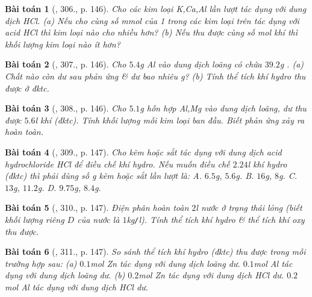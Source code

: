 \documentclass{article}
\newtheorem{baitoan}{Bài toán}
\begin{document}
\begin{baitoan}[\cite{An_400_BT_Hoa_Hoc_8_2020}, 306., p. 146]
	Cho các kim loại \emph{K,Ca,Al} lần lượt tác dụng với dung dịch \emph{HCl}. (a) Nếu cho cùng số mmol của 1 trong các kim loại trên tác dụng với acid \emph{HCl} thì kim loại nào cho nhiều \emph{} hơn? (b) Nếu thu được cùng số mol khí \emph{} thì khối lượng kim loại nào ít hơn?
\end{baitoan}

\begin{baitoan}[\cite{An_400_BT_Hoa_Hoc_8_2020}, 307., p. 146]
	Cho $5.4$\emph{g Al} vào dung dịch \emph{} loãng có chứa $39.2$\emph{g }. (a) Chất nào còn dư sau phản ứng \& dư bao nhiêu \emph{g}? (b) Tính thể tích khí hydro thu được ở đktc.
\end{baitoan}

\begin{baitoan}[\cite{An_400_BT_Hoa_Hoc_8_2020}, 308., p. 146]
	Cho $5.1$\emph{g} hỗn hợp \emph{Al,Mg} vào dung dịch \emph{} loãng, dư thu được $5.6$\emph{l} khí \emph{} (đktc). Tính khối lượng mỗi kim loại ban đầu. Biết phản ứng xảy ra hoàn toàn.
\end{baitoan}

\begin{baitoan}[\cite{An_400_BT_Hoa_Hoc_8_2020}, 309., p. 147]
	Cho kẽm hoặc sắt tác dụng với dung dịch acid hydrochloride \emph{HCl} để điều chế khí hydro. Nếu muốn điều chế $2.24$\emph{l} khí hydro (đktc) thì phải dùng số \emph{g} kẽm hoặc sắt lần lượt là: {\sf A.} $6.5$\emph{g}, $5.6$\emph{g}. {\sf B.} $16$\emph{g}, $8$\emph{g}. {\sf C.} $13$\emph{g}, $11.2$\emph{g}. {\sf D.} $9.75$\emph{g}, $8.4$\emph{g}.
\end{baitoan}

\begin{baitoan}[\cite{An_400_BT_Hoa_Hoc_8_2020}, 310., p. 147]
	Điện phân hoàn toàn $2$\emph{l} nước ở trạng thái lỏng (biết khối lượng riêng $D$ của nước là $1$\emph{kg\texttt{/}l}). Tính thể tích khí hydro \& thể tích khí oxy thu được.
\end{baitoan}

\begin{baitoan}[\cite{An_400_BT_Hoa_Hoc_8_2020}, 311., p. 147]
	So sánh thể tích khí hydro (đktc) thu được trong mỗi trường hợp sau: (a) $0.1$\emph{mol Zn} tác dụng với dung dịch \emph{} loãng dư. $0.1$\emph{mol Al} tác dụng với dung dịch \emph{} loãng dư. (b) $0.2$\emph{mol Zn} tác dụng với dung dịch \emph{HCl} dư. $0.2$\emph{mol Al} tác dụng với dung dịch \emph{HCl} dư.
\end{baitoan}
\end{document}

